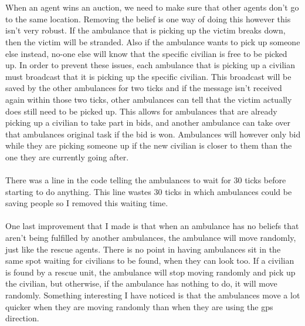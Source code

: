 \documentclass[titlepage]{article}
\begin{document}
    \\ \\
    When an agent wins an auction, we need to make sure that other agents don't go to the same location. Removing the belief is one way of doing this however this isn't very robust. If the ambulance that is picking up the victim breaks down, then the victim will be stranded. Also if the ambulance wants to pick up someone else instead, no-one else will know that the specific civilian is free to be picked up. In order to prevent these issues, each ambulance that is picking up a civilian must broadcast that it is picking up the specific civilian. This broadcast will be saved by the other ambulances for two ticks and if the message isn't received again within those two ticks, other ambulances can tell that the victim actually does still need to be picked up. This allows for ambulances that are already picking up a civilian to take part in bids, and another ambulance can take over that ambulances original task if the bid is won. Ambulances will however only bid while they are picking someone up if the new civilian is closer to them than the one they are currently going after.
    \\
    \\
    There was a line in the code telling the ambulances to wait for 30 ticks before starting to do anything. This line wastes 30 ticks in which ambulances could be saving people so I removed this waiting time.
    \\
    \\
    One last improvement that I made is that when an ambulance has no beliefs that aren't being fulfilled by another ambulances, the ambulance will move randomly, just like the rescue agents. There is no point in having ambulances sit in the same spot waiting for civilians to be found, when they can look too. If a civilian is found by a rescue unit, the ambulance will stop moving randomly and pick up the civilian, but otherwise, if the ambulance has nothing to do, it will move randomly. Something interesting I have noticed is that the ambulances move a lot quicker when they are moving randomly than when they are using the gps direction.
  
\end{document}
